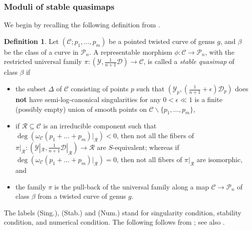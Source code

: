\documentclass[a4paper,12pt]{amsart}
\newcommand{\mts}[1]{\mathscr{#1}}
\newcommand{\sY}{{\mathscr{Y}}}
\newcommand{\sP}{{\mathscr{P}}}
\newcommand{\sD}{{\mathscr{D}}}
\newcommand{\sC}{{\mathscr{C}}}
\newcommand{\cR}{{\mathcal{R}}}
\theoremstyle{definition}
\newtheorem{defn}[theorem]{Definition}
\theoremstyle{remark}
\begin{document}
\subsubsection{Moduli of stable quasimaps}
We begin by recalling the following definition from \cite{twisted_map_2}.
\begin{defn}\label{def_stable_qmap}
   Let $(\mts{C};p_1,\ldots,p_m)$ be a pointed twisted curve of genus $g$, and $\beta$ be the class of a curve in $\sP_n$. A representable morphism $\phi:\mts{C}\rightarrow \sP_n$, with the restricted universal family $\pi:(\sY,\frac{1}{n+1}\sD)\to \sC$, is called a \emph{stable quasimap} of class $\beta$ if
    \begin{itemize}
            \item[(Sing.)] the subset $\Delta$ of $\mathscr{C}$ consisting of points $p$ such that $(\sY_p,(\frac{1}{n+1}+\epsilon)\sD_p)$ does {\bf{not}} have semi-log-canonical singularities for any $0<\epsilon \ll 1$ is a finite (possibly empty) union of smooth points on $\sC\smallsetminus\{p_1,\ldots,p_m\}$,
            \item[(Stab.)] if $\cR\subseteq \sC$ is an irreducible component such that $\deg(\omega_\sC(p_1+\ldots+p_m) |_\cR)< 0$, then not all the fibers of $\pi|_\cR\colon(\sY|_\cR,\frac{1}{n+1}\sD|_\cR)\to \cR$ are $S$-equivalent; whereas if $\deg(\omega_\sC(p_1+\ldots+p_m) |_\cR)=0$, then not all fibers of $\pi|_\cR$ are isomorphic, and
            \item[(Num.)] the family $\pi$ is the pull-back of the universal family along a map $\sC\to \sP_n$ of class $\beta$ from a twisted curve of genus $g$.
        \end{itemize}
\end{defn}



The labels (Sing.), (Stab.) and (Num.) stand for singularity condition, stability condition, and numerical condition. The following follows from \cite[Theorem 1]{twisted_map_2}; see also \cite[Theorem 2]{twisted_map_2}.
\end{document}
